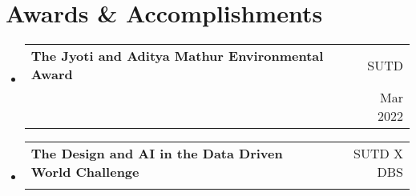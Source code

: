 \documentclass[letterpaper,11pt]{article}
\makeatletter
\newcommand{\resumeItem}[1]{
  \item\small{
    {#1 \vspace{-2.5pt}}
  }
}
\newcommand{\resumeSubheading}[4]{
  \vspace{-2pt}\item
    \begin{tabular*}{0.97\textwidth}[t]{l@{\extracolsep{\fill}}r}
      \textbf{#1} & \footnotesize{#2} \\
      {\small#3} & {\footnotesize #4} \\
    \end{tabular*}\vspace{-7pt}
}
\newcommand{\resumeSubHeadingListStart}{\begin{itemize}[leftmargin=0.15in, label={}]}
\newcommand{\resumeSubHeadingListEnd}{\end{itemize}}
\makeatother
\begin{document}
\section{Awards \& Accomplishments}
 \resumeSubHeadingListStart
    \resumeSubheading
      {The Jyoti and Aditya Mathur Environmental Award}{\footnotesize{SUTD}}
      {\normalfont{Organised SUTD's first sustainability design thinking hackathon with SG Minister as Guest of Honor}}{\footnotesize{Mar 2022}}
    \resumeSubheading
      {The Design and AI in the Data Driven World  Challenge}{SUTD X DBS}
      {\normalfont{Won 500 SGD in pitching an AI powered credit card recommendation engine in Paylah App}}{\normalfont{Sept 2021}}
  \resumeSubHeadingListEnd









\end{document}
